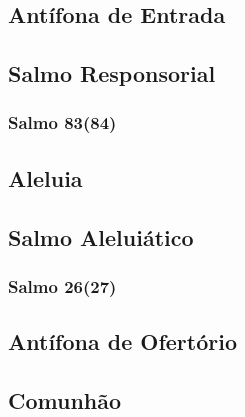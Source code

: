 \subsection{Antífona de Entrada}\label{subsection:tempus-nativitatis/sanctae-familiae/introitus}

\subsection{Salmo Responsorial}\label{subsection:tempus-nativitatis/sanctae-familiae/psalmus-responsorius}
\subsubsection{Salmo 83(84)}

\AllowPageFlush

\subsection{Aleluia}\label{subsection:tempus-nativitatis/sanctae-familiae/alleluia}

\AllowPageFlush

\subsection[Salmo Aleluiático]{Salmo Aleluiático}\label{subsection:tempus-nativitatis/sanctae-familiae/psalmus-alleluiaticus}
\subsubsection{Salmo 26(27)}

\AllowPageFlush

\subsection{Antífona de Ofertório}\label{subsection:tempus-nativitatis/sanctae-familiae/offertorium}

\AllowPageBreak

\subsection{Comunhão}\label{subsection:tempus-nativitatis/sanctae-familiae/communio}

\AllowPageFlush